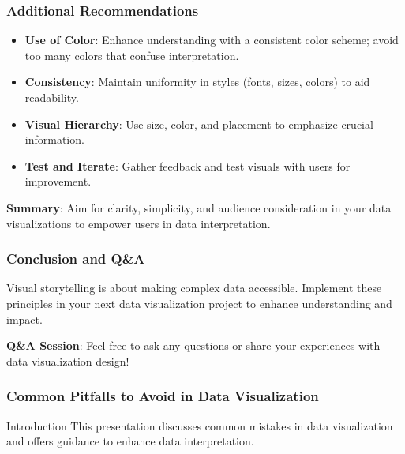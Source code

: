 \documentclass[aspectratio=169]{beamer}
\begin{document}
\begin{frame}[fragile]
    \frametitle{Additional Recommendations}
    \begin{itemize}
        \item \textbf{Use of Color}: Enhance understanding with a consistent color scheme; avoid too many colors that confuse interpretation.
        
        \item \textbf{Consistency}: Maintain uniformity in styles (fonts, sizes, colors) to aid readability.
        
        \item \textbf{Visual Hierarchy}: Use size, color, and placement to emphasize crucial information.
        
        \item \textbf{Test and Iterate}: Gather feedback and test visuals with users for improvement.
    \end{itemize}
    
    \textbf{Summary}: Aim for clarity, simplicity, and audience consideration in your data visualizations to empower users in data interpretation.
\end{frame}

\begin{frame}[fragile]
    \frametitle{Conclusion and Q\&A}
    Visual storytelling is about making complex data accessible. Implement these principles in your next data visualization project to enhance understanding and impact.
    
    \textbf{Q\&A Session}: Feel free to ask any questions or share your experiences with data visualization design!
\end{frame}

\begin{frame}[fragile]
    \frametitle{Common Pitfalls to Avoid in Data Visualization}
    \begin{block}{Introduction}
        This presentation discusses common mistakes in data visualization and offers guidance to enhance data interpretation.
    \end{block}
\end{frame}
\end{document}
